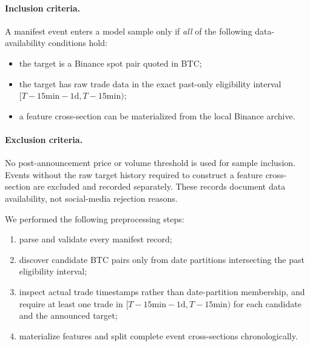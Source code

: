 \documentclass{ieeeaccess}
\begin{document}
\paragraph{Inclusion criteria.}
A manifest event enters a model sample only if \emph{all} of the following data-availability conditions hold:
\begin{itemize}
    \item the target is a Binance spot pair quoted in BTC;
    \item the target has raw trade data in the exact past-only eligibility interval $[T-15\text{min}-1\text{d},T-15\text{min})$;
    \item a feature cross-section can be materialized from the local Binance archive.
\end{itemize}

\paragraph{Exclusion criteria.}
No post-announcement price or volume threshold is used for sample inclusion. \textcolor{revisionblue}{Events without the raw target history required to construct} a \textcolor{revisionblue}{feature cross-section are excluded and recorded separately. These} records \textcolor{revisionblue}{document data availability,} not social-media rejection reasons.

We performed the following preprocessing steps:
\begin{enumerate}
    \item parse and validate every manifest record;
    \item discover candidate BTC pairs only from date partitions intersecting the past eligibility interval;
    \item inspect actual trade timestamps rather than date-partition membership, and require at least one trade in $[T-15\text{min}-1\text{d},T-15\text{min})$ for each candidate and the announced target;
    \item materialize features and split complete event cross-sections chronologically.
\end{enumerate}
\end{document}
